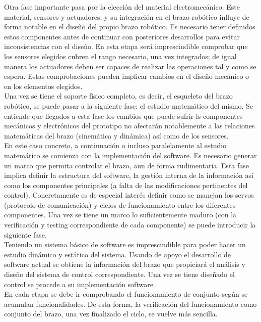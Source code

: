 Otra fase importante pasa por la elección del material electromecánico. Este material, sensores y actuadores, y su integración en el brazo robótico influye de forma notable en el diseño del propio brazo robótico. Es necesario tener definidos estos componentes antes de continuar con posteriores desarrollos para evitar inconsistencias con el diseño. En esta etapa será imprescindible comprobar que los sensores elegidos cubren el rango necesario, una vez integrados; de igual manera los actuadores deben ser capaces de realizar las operaciones tal y como se espera. Estas comprobaciones pueden implicar cambios en el diseño mecánico o en los elementos elegidos.
\\

Una vez se tiene el soporte físico completo, es decir, el esqueleto del brazo robótico, se puede pasar a la siguiente fase: el estudio matemático del mismo. Se entiende que llegados a esta fase los cambios que puede sufrir ls componentes mecánicos y electrónicos del prototipo no afectarán notablemente a las relaciones matemáticas del brazo (cinemática y dinámica) así como de los sensores.
\\

En este caso concreto, a continuación o incluso paralelamente al estudio matemático se comienza con la implementación del software. Es necesario generar un marco que permita controlar el brazo, aun de forma rudimentaria. Esta fase implica definir la estructura del software, la gestión interna de la información así como los componentes principales (a falta de las modificaciones pertinentes del control). Concretamente es de especial interés definir como se manejan los servos (protocolo de comunicación) y ciclos de funcionamiento entre los diferentes componentes. Una vez se tiene un marco lo suficientemente maduro (con la verificación y testing correspondiente de cada componente) se puede introducir la siguiente fase.
\\

Teniendo un sistema básico de software es imprescindible para poder hacer un estudio dinámico y estático del sistema. Usando de apoyo el desarrollo de software actual se obtiene la información del brazo que propiciará el análisis y diseño del sistema de control correspondiente. Una vez se tiene diseñado el control se procede a su implementación software.
\\

En cada etapa se debe ir comprobando el funcionamiento de conjunto según se acumulan funcionalidades. De esta forma, la verificación del funcionamiento como conjunto del brazo, una vez finalizado el ciclo, se vuelve más sencilla. 
\\

